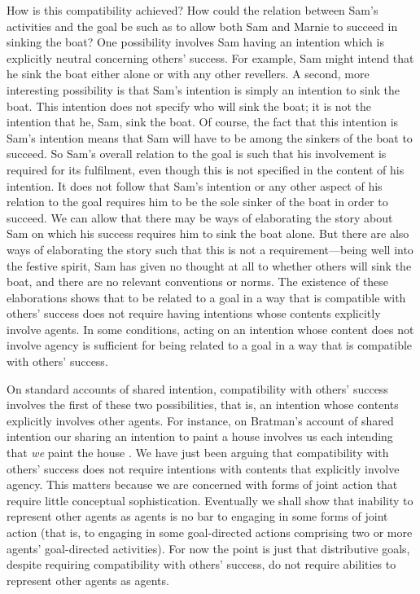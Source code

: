 \documentclass[12pt,a4paper]{extarticle}
\begin{document}
How is this compatibility achieved?  How could the relation between Sam's activities and the goal be such as to allow both Sam and Marnie to succeed in sinking the boat?
One possibility involves Sam having an intention which is explicitly neutral concerning others' success.  
For example, Sam might intend that he sink the boat either alone or with any other revellers.
A second, more interesting possibility is that Sam's intention is simply an intention to sink the boat.
This intention does not specify who will sink the boat; it is not the intention that he, Sam, sink the boat.
Of course, the fact that this intention is Sam's intention means that Sam will have to be among the sinkers of the boat to succeed.  
So Sam's overall relation to the goal is such that his involvement is required for its fulfilment, even though this is not specified in the content of his intention.
It does not follow that Sam's intention or any other aspect of his relation to the goal requires him to be the sole sinker of the boat in order to succeed.
We can allow that there may be ways of elaborating the story about Sam on which his success requires him to sink the boat alone.  
But there are also ways of elaborating the story such that this is not a requirement---being well into the festive spirit, Sam has given no thought at all to whether others will sink the boat, and there are no relevant conventions or norms.
The existence of these elaborations shows that to be related to a goal in a way that is compatible with others' success does not require having intentions whose contents explicitly involve agents.
In some conditions, acting on an intention whose content does not  involve agency is sufficient for being related to a goal in a way that is compatible with others' success.

On standard accounts of shared intention, compatibility with others' success involves the first of these two possibilities, that is, an intention whose contents  explicitly involves other agents.  
For instance, on Bratman's account of shared intention our sharing an intention to paint a house involves us each intending that \emph{we} paint the house \citep[p.\ 333]{Bratman:1992mi}.
We have just been arguing that compatibility with  others' success does not require intentions with contents that explicitly involve agency.
This matters because we are concerned with  forms of joint action that require little conceptual sophistication.  
Eventually we shall show that inability to represent other agents as agents is no bar to engaging in some forms of joint action (that is, to engaging in some goal-directed actions comprising two or more agents' goal-directed activities).
For now the point is just that distributive goals, despite requiring compatibility with others' success, do not require abilities to represent other agents as agents.
\end{document}
